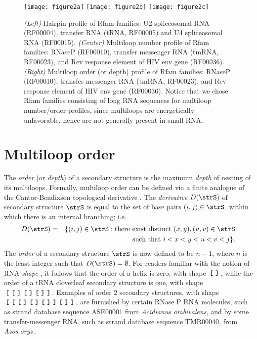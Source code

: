 \begin{figure}[tbhp]
\centering
\texttt{[image: figure2a]}
\texttt{[image: figure2b]}
\texttt{[image: figure2c]}
\caption{{\em (Left)}
Hairpin profile of Rfam families:
U2 spliceosomal RNA (RF00004),
transfer RNA (tRNA, RF00005) and
U4 spliceosomal RNA (RF00015).
{\em (Center)}
Multiloop number profile of
Rfam families: RNaseP (RF00010), transfer messenger RNA (tmRNA, RF00023),
and Rev response element of HIV env gene (RF00036).
{\em (Right)}
Multiloop order (or depth) profile of
Rfam families: RNaseP (RF00010), transfer messenger RNA (tmRNA, RF00023),
and Rev response element of HIV env gene (RF00036).
Notice that we chose Rfam families consisting of long RNA sequences
for multiloop number/order profiles, since multiloops are energetically
unfavorable, hence are not generally present in small RNA.
}
\label{fig:RfamProfiles}
\end{figure}

\section{Multiloop order}
\label{section:multiloopOrderPartitionFunction}


The {\em order} (or {\em depth}) of a secondary structure is
the maximum {\em depth} of nesting of its multiloops.
Formally, multiloop order
can be defined via a finite analogue of the Cantor-Bendixson topological
derivative \citep{clote:CantorBendixson,kechris}.
The {\em derivative} $D(\strS)$ of secondary
structure $\strS$ is equal to the set of base pairs $(i,j) \in \strS$,
within which there is an internal branching; i.e.
\begin{eqnarray*}
D(\strS) &=& \{ (i,j) \in \strS : \mbox{there exist distinct
$(x,y),(u,v) \in \strS$} \\
&&\mbox{such that $i<x<y<u<v<j$} \}.
\end{eqnarray*}
The {\em order} of a secondary structure $\strS$ is now
defined to be $n-1$, where $n$ is the least integer such that
$D(\strS)=\emptyset$. For readers familiar with the notion of
RNA {\em shape} \citep{giegerich:shapesNAR},
it follows that the order of a helix is
zero, with shape $\,\mbox{\bf\texttt{[}}\, \,\mbox{\bf\texttt{]}}\,$, while the order of a tRNA cloverleaf secondary
structure is one, with shape $\,\mbox{\bf\texttt{[}}\, \,\mbox{\bf\texttt{[}}\, \,\mbox{\bf\texttt{]}}\, \,\mbox{\bf\texttt{[}}\, \,\mbox{\bf\texttt{]}}\, \,\mbox{\bf\texttt{[}}\, \,\mbox{\bf\texttt{]}}\, \,\mbox{\bf\texttt{]}}\,$.
Examples of order $2$ secondary structures, with shape
$\,\mbox{\bf\texttt{[}}\, \,\mbox{\bf\texttt{[}}\, \,\mbox{\bf\texttt{[}}\, \,\mbox{\bf\texttt{]}}\, \,\mbox{\bf\texttt{[}}\, \,\mbox{\bf\texttt{]}}\, \,\mbox{\bf\texttt{[}}\, \,\mbox{\bf\texttt{]}}\, \,\mbox{\bf\texttt{]}}\, \,\mbox{\bf\texttt{[}}\, \,\mbox{\bf\texttt{]}}\, \,\mbox{\bf\texttt{]}}\,$, are furnished by
certain RNase P RNA molecules, such as
{\sc strand} database \citep{Andronescu.bb08} sequence
ASE00001 from {\em Acidianus ambivalens}, and by some transfer-messenger
RNA, such as {\sc strand} database sequence
TMR00040, from {\em Azos.oryz.}.

